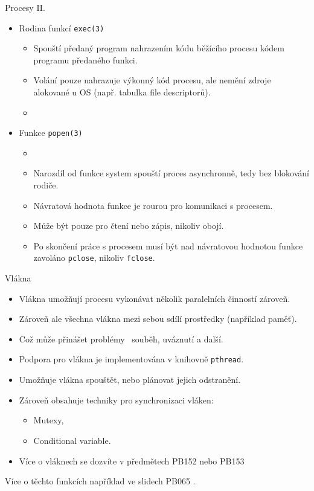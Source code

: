 \documentclass[handout]{beamer}
\begin{document}
\begin{frame}{Procesy II.}
    \begin{itemize}
        \item Rodina funkcí \texttt{exec(3)}
            \begin{itemize}
                \item Spouští předaný program nahrazením kódu běžícího procesu kódem programu předaného funkci.
                \item Volání pouze nahrazuje výkonný kód procesu, ale nemění zdroje alokované u OS (např. tabulka file descriptorů).
                \item {}
            \end{itemize}
        \item Funkce \texttt{popen(3)}
            \begin{itemize}
                \item {}
                \item Narozdíl od funkce system spouští proces asynchronně, tedy bez blokování rodiče.
                \item Návratová hodnota funkce je rourou pro komunikaci s procesem.
                \item Může být pouze pro čtení nebo zápis, nikoliv obojí.
                \item Po skončení práce s procesem musí být nad návratovou hodnotou funkce zavoláno \texttt{pclose}, nikoliv \texttt{fclose}.
            \end{itemize}
    \end{itemize}
\end{frame}
\begin{frame}{Vlákna}
    \begin{itemize}
        \item Vlákna umožňují procesu vykonávat několik paralelních činností zároveň.
        \item Zároveň ale všechna vlákna mezi sebou sdílí prostředky (například paměť).
        \item Což může přinášet problémy \faLongArrowRight $\,$ souběh, uváznutí a další.
        \item Podpora pro vlákna je implementována v knihovně \texttt{pthread}.
        \item Umožňuje vlákna spouštět, nebo plánovat jejich odstranění.
        \item Zároveň obsahuje techniky pro synchronizaci vláken:
            \begin{itemize}
                \item Mutexy,
                \item Conditional variable.
            \end{itemize}
        \item Více o vláknech se dozvíte v předmětech PB152 nebo PB153
    \end{itemize}
    Více o těchto funkcích například ve slidech PB065 \cite{kas}.
\end{frame}
\end{document}
